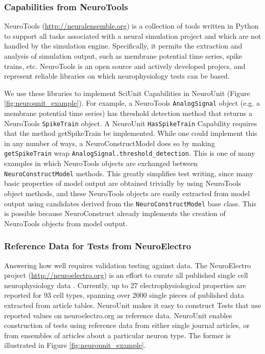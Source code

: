 \documentclass[11pt,letterpaper]{article}
\begin{document}
\subsubsection{Capabilities from NeuroTools}
NeuroTools (\url{http://neuralensemble.org}) is a collection of tools written in Python to support all tasks associated with a neural simulation project and which are not handled by the simulation engine.  Specifically, it permits the extraction and analysis of simulation output, such as membrane potential time series, spike trains, etc. NeuroTools is an open source and actively developed projecs, and represent reliable libraries on which neurophysiology tests can be based. 

We use these libraries to implement SciUnit Capabilities in NeuroUnit (Figure \ref{fig:neurounit_example}).  For example, a NeuroTools \verb|AnalogSignal| object (e.g. a membrane potential time series) has threshold detection method that returns a NeuroTools \verb|SpikeTrain| object.  A NeuroUnit \verb|HasSpikeTrain| Capability requires that the method getSpikeTrain be implemented.  While one could implement this in any number of ways, a NeuroConstructModel does so by making \verb|getSpikeTrain| wrap \verb|AnalogSignal.threshold_detection|.  This is one of many examples in which NeuroTools objects are exchanged between \verb|NeuroConstructModel| methods.  This greatly simplifies test writing, since many basic properties of model output are obtained trivially by using NeuroTools object methods, and these NeuroTools objects are easily extracted from model output using candidates derived from the \verb|NeuroConstructModel| base class.  This is possible because NeuroConstruct already implements the creation of NeuroTools objects from model output.  

\subsubsection{Reference Data for Tests from NeuroElectro}
Answering how well requires validation testing against data. The NeuroElectro project (\url{http://neuroelectro.org}) is an effort to curate all published single cell neurophysiology data \cite{tripathy_neuroelectro:_2012}.  Currently, up to 27 electrophysiological properties are reported for 93 cell types, spanning over 2000 single pieces of published data extracted from article tables.  NeuroUnit makes it easy to construct Tests that use reported values on neuroelectro.org as reference data.  NeuroUnit enables construction of tests using reference data from either single journal articles, or from ensembles of articles about a particular neuron type.  The former is illustrated in Figure \ref{fig:neurounit_example}.
\end{document}
